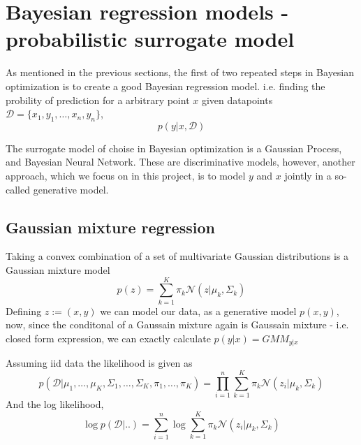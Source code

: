 \chapter{Bayesian regression models - probabilistic surrogate model}
As mentioned in the previous sections, the first of two repeated steps in Bayesian optimization
is to create a good Bayesian regression model. %
i.e. finding the probility of prediction for a arbitrary point $x$ given datapoints 
$\mathcal{D} = \{x_1, y_1, \dots, x_n, y_n\}$, 
 $$p(y|x,\mathcal{D})$$

The surrogate model of choise in Bayesian optimization is a Gaussian Process, and Bayesian Neural Network.
These are discriminative models, however, another approach, which we focus on in this project, is
to model $y$ and $x$ jointly in a so-called generative model.

\section{Gaussian mixture regression}
Taking a convex combination of a set of multivariate Gaussian distributions is a Gaussian mixture model
$$p(z) = \sum_{k=1}^K \pi_k \mathcal{N}(z|\mu_k, \Sigma_k)$$  
Defining $z := (x,y)$ we can model our data, as a generative model $p(x,y)$, now, since the conditonal 
of a Gaussain mixture again is Gaussain mixture - i.e. closed form expression, we can exactly calculate
$p(y|x) = GMM_{y|x}$

Assuming iid data the likelihood is given as 
$$p(\mathcal{D}|\mu_1, \dots, \mu_K, \Sigma_1, \dots, \Sigma_K, \pi_1, \dots, \pi_K) = \prod_{i=1}^n \sum_{k=1}^K \pi_k \mathcal{N}(z_i|\mu_k, \Sigma_k)$$
And the log likelihood, 
$$\log p(\mathcal{D}| ..) = \sum_{i=1}^n \log \sum_{k=1}^K \pi_k \mathcal{N}(z_i|\mu_k, \Sigma_k)$$


